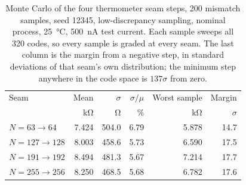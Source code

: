 \begin{table}[htbp]
  \centering
  \caption[{Monte Carlo of the four thermometer seam steps.}]{Monte Carlo of the four thermometer seam steps, 200 mismatch samples, seed 12345, low-discrepancy sampling, nominal process, \SI{25}{\celsius}, \SI{500}{\nano\ampere} test current. Each sample sweeps all 320 codes, so every sample is graded at every seam. The last column is the margin from a negative step, in standard deviations of that seam's own distribution; the minimum step anywhere in the code space is \(137\sigma\) from zero.}
  \label{tab:tiarprog-seams}
  \begin{tabular}{lrrrrr}
    \toprule
    Seam & Mean & $\sigma$ & $\sigma/\mu$ & Worst sample & Margin \\
     & \si{\kilo\ohm} & \si{\ohm} & \si{\percent} & \si{\kilo\ohm} & $\sigma$ \\
    \midrule
    $N = 63 \to 64$   & 7.424 & 504.0 & 6.79 & 5.878 & 14.7 \\
    $N = 127 \to 128$ & 8.003 & 458.6 & 5.73 & 6.590 & 17.5 \\
    $N = 191 \to 192$ & 8.494 & 481.3 & 5.67 & 7.214 & 17.7 \\
    $N = 255 \to 256$ & 8.250 & 468.5 & 5.68 & 6.782 & 17.6 \\
    \bottomrule
  \end{tabular}
\end{table}

